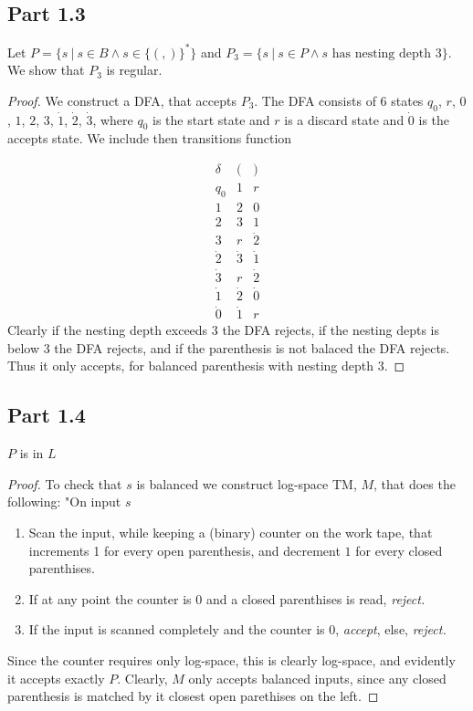 \documentclass[a4paper,11pt]{article}
\newcommand{\pipe}{\ \vert \ }
\numberwithin{equation}{section}
\begin{document}
	\subsection*{Part 1.3}
	Let $ P=\{s\pipe s\in B\wedge s\in \{(,)\}^*\} $ and $ P_3=\{s\pipe s\in P\wedge s\text{ has nesting depth }3\} $. We show that $ P_3 $ is regular.\begin{proof}
		We construct a DFA, that accepts $ P_3 $. The DFA consists of $ 6 $ states $ q_0 $, $ r $, $ 0 $, $ 1 $, $ 2 $, $ 3 $, $ \dot{1} $, $ \dot{2} $, $ \dot{3} $, where $ q_0 $ is the start state and $ r $ is a discard state and $ \dot{0} $ is the accepts state. We include then transitions function
		
		\begin{equation*}
			\begin{array}{l|l|l}
			\delta&(&)\\
			\hline
			q_0&1&r\\
			1&2&0\\
			2&3&1\\
			3&r&\dot{2}\\
			\dot{2}&\dot{3}&\dot{1}\\
			\dot{3}&r&\dot{2}\\
			\dot{1}&\dot{2}&\dot{0}\\
			\dot{0}&\dot{1}&r
			\end{array}
		\end{equation*}
		 Clearly if the nesting depth exceeds $ 3 $ the DFA rejects, if the nesting depts is below $ 3 $ the DFA rejects, and if the parenthesis is not balaced the DFA rejects. Thus it only accepts, for balanced parenthesis with nesting depth $ 3 $.
	\end{proof}
\subsection*{Part 1.4}
$ P $ is in $ L $\begin{proof}
	To check that $ s $ is balanced we construct log-space TM, $ M $, that does the following: "On input $ s $\begin{enumerate}
		\item Scan the input, while keeping a (binary) counter on the work tape, that increments 1 for every open parenthesis, and decrement $ 1 $ for every closed parenthises.
		\item If at any point the counter is $ 0 $ and a closed parenthises is read, \emph{reject.} 
		\item If the input is scanned completely and the counter is $ 0 $, \emph{accept}, else, \emph{reject.}
	\end{enumerate}
	Since the counter requires only log-space, this is clearly log-space, and evidently it accepts exactly $ P $. Clearly, $ M $ only accepts balanced inputs, since any closed parenthesis is matched by it closest open parethises on the left.
\end{proof}
\end{document}
